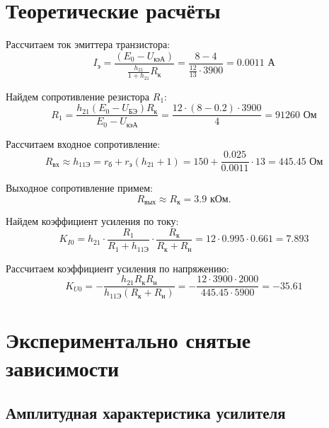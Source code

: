 \section{Теоретические расчёты}

Рассчитаем ток эмиттера транзистора: 
\begin{equation}
I_\text{э} = \frac{(E_0 - U_\text{кэА})}{\frac{h_{21}}{1+h_{21}}R_\text{к}} = \frac{8 - 4}{\frac{12}{13} \cdot 3900} = 0.0011 \text{ А}
\end{equation}

Найдем сопротивление резистора $R_1$:
\begin{equation}
R_1 = \frac{h_{21}(E_0-U_\text{БЭ})R_\text{к}}{E_0-U_\text{кэА}} = \frac{12 \cdot (8 - 0.2) \cdot 3900}{4} = 91260 \text{ Ом}
\end{equation}

Рассчитаем входное сопротивление:
\begin{equation}
R_\text{вх} \approx h_\text{11Э} = r_\text{б} + r_\text{э}(h_{21} + 1) = 150 + \frac{0.025}{0.0011} \cdot 13 = 445.45 \text{ Ом}
\end{equation}

Выходное сопротивление примем:
\begin{equation}
R_\text{вых} \approx R_\text{к} = 3.9 \text{ кОм}.
\end{equation}

Найдем коэффициент усиления по току:
\begin{equation}
K_{I0} = h_{21} \cdot \frac{R_1}{R_1 + h_\text{11Э}} \cdot \frac{R_\text{к}}{R_\text{к}+R_\text{н}} 
= 12 \cdot 0.995 \cdot 0.661 = 7.893
\end{equation}

Рассчитаем коэффициент усиления по напряжению:
\begin{equation}
K_{U0} = -\frac{h_{21} R_\text{к} R_\text{н}}{h_\text{11Э}(R_\text{к} + R_\text{н})} = -\frac{12 \cdot 3900 \cdot 2000}{445.45 \cdot 5900} = -35.61
\end{equation}

\newpage

\section{Экспериментально снятые зависимости}

\subsection{Амплитудная характеристика усилителя}

